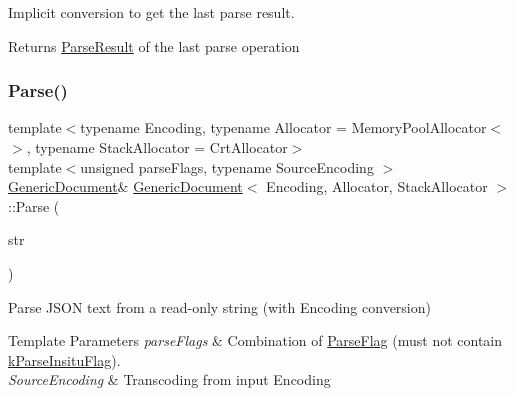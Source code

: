 Implicit conversion to get the last parse result. 

\begin{DoxyReturn}{Returns}
\hyperlink{a02188}{Parse\+Result} of the last parse operation
\end{DoxyReturn}

 \mbox{\label{a01996_aadee36db7064cc9894a75c848831cdae}} 
\subsubsection{\texorpdfstring{Parse()}{Parse()}\hspace{0.1cm}{\footnotesize\ttfamily [1/3]}}
{\footnotesize\ttfamily template$<$typename Encoding, typename Allocator = Memory\+Pool\+Allocator$<$$>$, typename Stack\+Allocator = Crt\+Allocator$>$ \\
template$<$unsigned parse\+Flags, typename Source\+Encoding $>$ \\
\hyperlink{a01996}{Generic\+Document}\& \hyperlink{a01996}{Generic\+Document}$<$ Encoding, Allocator, Stack\+Allocator $>$\+::Parse (\begin{DoxyParamCaption}\item[{const typename Source\+Encoding\+::\+Ch $\ast$}]{str }\end{DoxyParamCaption})\hspace{0.3cm}{\ttfamily [inline]}}



Parse J\+S\+ON text from a read-\/only string (with Encoding conversion) 


\begin{DoxyTemplParams}{Template Parameters}
{\em parse\+Flags} & Combination of \hyperlink{a00563_ab7be7dabe6ffcba60fad441505583450}{Parse\+Flag} (must not contain \hyperlink{a00563_ab7be7dabe6ffcba60fad441505583450a13188bd483b4df0b6582bebe2aeb5b01}{k\+Parse\+Insitu\+Flag}). \\
\hline
{\em Source\+Encoding} & Transcoding from input Encoding \\
\hline
\end{DoxyTemplParams}

